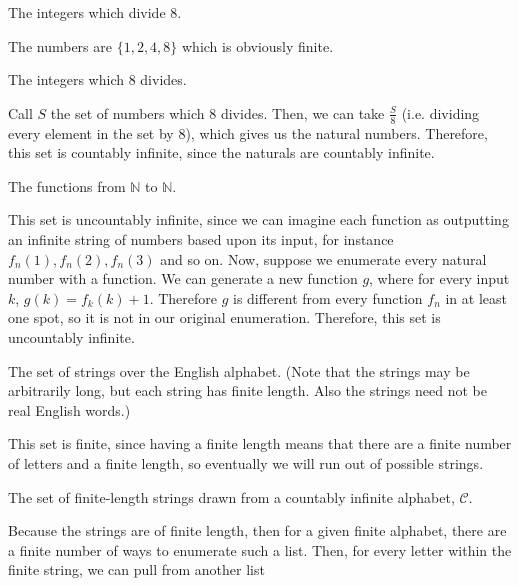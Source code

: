 \documentclass[11pt]{article}
\begin{document}
\begin{Parts}

\Part The integers which divide $8$.

\begin{solution}
  The numbers are $\{1, 2, 4, 8\}$ which is obviously finite.
\end{solution}

\Part The integers which $8$ divides.

\begin{solution}
  Call $S$ the set of numbers which 8 divides. Then, we can take $\frac{S}{8}$ (i.e. dividing every element in the set by 8), which gives us the natural numbers. Therefore, this set is countably infinite, since the naturals are countably infinite.
\end{solution}

\Part The functions from $\mathbb{N}$ to $\mathbb{N}$.

\begin{solution}
  This set is uncountably infinite, since we can imagine each function as outputting an infinite string of numbers based upon its input, for instance $f_n(1), f_n(2), f_n(3)$ and so on. Now, suppose we enumerate every natural number with a function. We can generate a new function $g$, where for every input $k$, $g(k) = f_k(k) + 1$. Therefore $g$ is different from every function $f_n$ in at least one spot, so it is not in our original enumeration. Therefore, this set is uncountably infinite.
\end{solution}

\Part The set of strings over the English alphabet. (Note that the strings may be arbitrarily long, but each string has finite length. Also the strings need not be real English words.)

\begin{solution}
  This set is finite, since having a finite length means that there are a finite number of letters and a finite length, so eventually we will run out of possible strings.  
\end{solution}

\Part The set of finite-length strings drawn from a countably infinite alphabet, $\mathcal{C}$.

\begin{solution}
  Because the strings are of finite length, then for a given finite alphabet, there are a finite number of ways to enumerate such a list. Then, for every letter within the finite string, we can pull from another list
\end{solution}


\end{Parts}
\end{document}
